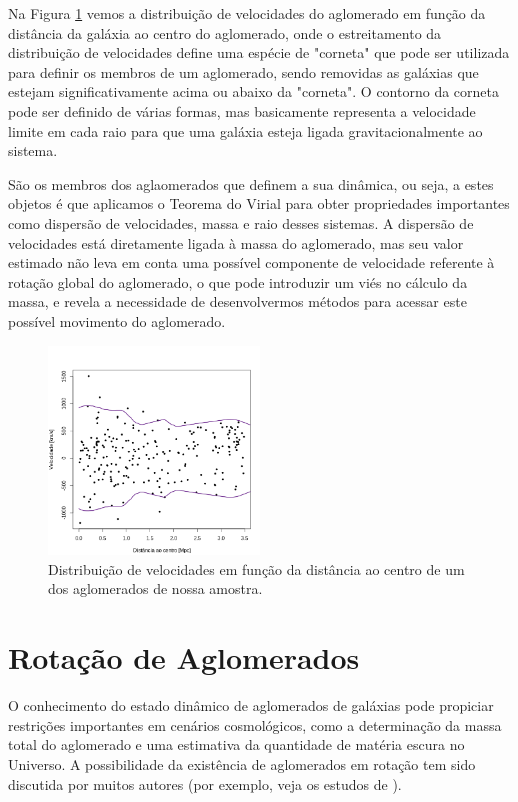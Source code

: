 Na Figura \ref{fig2} vemos a distribuição de velocidades do aglomerado em função da distância da galáxia ao centro do aglomerado, onde o estreitamento da distribuição de velocidades define uma espécie de "corneta" que pode ser utilizada para definir os membros de um aglomerado, sendo removidas as galáxias que estejam significativamente acima ou abaixo da "corneta". O contorno da corneta pode ser definido de várias formas, mas basicamente
representa a velocidade limite em cada raio para que uma galáxia esteja ligada gravitacionalmente ao sistema.

São os membros dos aglaomerados que definem a sua dinâmica, ou seja,
a estes objetos é que aplicamos o Teorema do Virial para obter propriedades importantes como dispersão de velocidades, massa e raio desses sistemas.
A dispersão de velocidades está diretamente ligada à massa do aglomerado, mas seu valor estimado não leva em conta
uma possível componente de velocidade referente à rotação global do aglomerado, o que pode introduzir um viés no cálculo da massa,
e revela a necessidade de desenvolvermos métodos para acessar este possível movimento do aglomerado.

\begin{figure}[H]
	\centering
	\includegraphics[width=0.5\textwidth]{04-figuras/10043}
	\caption{Distribuição de velocidades em função da distância ao centro de um dos aglomerados de nossa amostra.}
	\label{fig2}
\end{figure}

\section{Rotação de Aglomerados}

O conhecimento do estado dinâmico de aglomerados de galáxias pode propiciar restrições importantes em cenários cosmológicos, como a determinação da massa total do aglomerado e uma estimativa da quantidade de matéria escura no Universo. A possibilidade da existência de aglomerados em rotação tem sido discutida por muitos autores (por exemplo, veja os estudos de \cite{hwang2007searching, manolopoulou2016galaxy}). 

